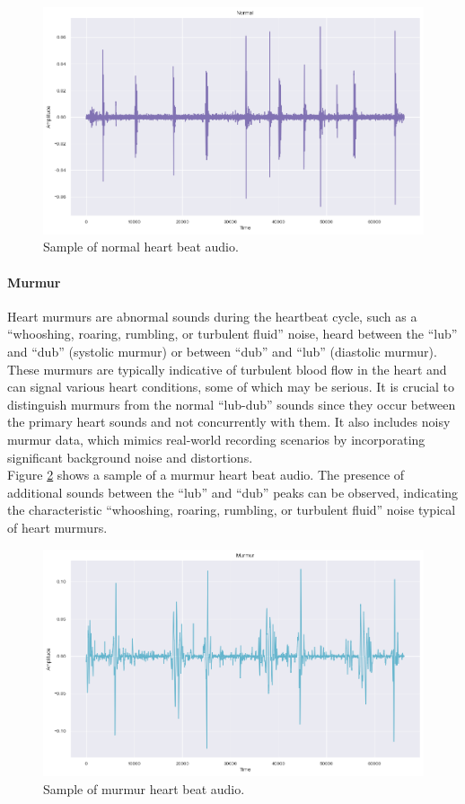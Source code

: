 \begin{figure}[H]
    \centering
    \includegraphics[width=.8\columnwidth]{../images/normal_heart_beat_audio.png}
    \caption{Sample of normal heart beat audio.}
    \label{fig:normal_heart_beat_audio}
\end{figure}

\paragraph{Murmur}
Heart murmurs are abnormal sounds during the heartbeat cycle, such as a ``whooshing, roaring, rumbling, or turbulent fluid'' noise, heard between
the ``lub'' and ``dub'' (systolic murmur) or between ``dub'' and ``lub'' (diastolic murmur).
These murmurs are typically indicative of turbulent blood flow in the heart and can signal various heart conditions, some of which may be serious.
It is crucial to distinguish murmurs from the normal ``lub-dub'' sounds since they occur between the primary heart sounds and not concurrently with them.
It also includes noisy murmur data, which mimics real-world recording scenarios by incorporating significant background noise and distortions.\\
Figure \ref{fig:murmur_heart_beat_audio} shows a sample of a murmur heart beat audio.
The presence of additional sounds between the ``lub'' and ``dub'' peaks can be observed, indicating the characteristic
``whooshing, roaring, rumbling, or turbulent fluid'' noise typical of heart murmurs.

\begin{figure}[H]
    \centering
    \includegraphics[width=.8\columnwidth]{../images/murmur_heart_beat_audio.png}
    \caption{Sample of murmur heart beat audio.}
    \label{fig:murmur_heart_beat_audio}
\end{figure}


